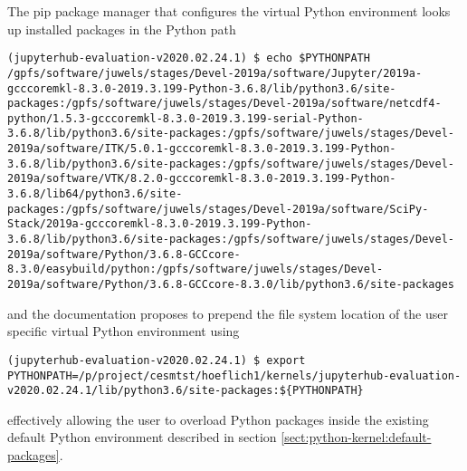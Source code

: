 \documentclass[11pt,a4paper]{article}
\begin{document}
The pip package manager that configures the virtual Python environment looks up installed packages in the Python path
%
\begin{verbatim}
(jupyterhub-evaluation-v2020.02.24.1) $ echo $PYTHONPATH
/gpfs/software/juwels/stages/Devel-2019a/software/Jupyter/2019a-gcccoremkl-8.3.0-2019.3.199-Python-3.6.8/lib/python3.6/site-packages:/gpfs/software/juwels/stages/Devel-2019a/software/netcdf4-python/1.5.3-gcccoremkl-8.3.0-2019.3.199-serial-Python-3.6.8/lib/python3.6/site-packages:/gpfs/software/juwels/stages/Devel-2019a/software/ITK/5.0.1-gcccoremkl-8.3.0-2019.3.199-Python-3.6.8/lib/python3.6/site-packages:/gpfs/software/juwels/stages/Devel-2019a/software/VTK/8.2.0-gcccoremkl-8.3.0-2019.3.199-Python-3.6.8/lib64/python3.6/site-packages:/gpfs/software/juwels/stages/Devel-2019a/software/SciPy-Stack/2019a-gcccoremkl-8.3.0-2019.3.199-Python-3.6.8/lib/python3.6/site-packages:/gpfs/software/juwels/stages/Devel-2019a/software/Python/3.6.8-GCCcore-8.3.0/easybuild/python:/gpfs/software/juwels/stages/Devel-2019a/software/Python/3.6.8-GCCcore-8.3.0/lib/python3.6/site-packages
\end{verbatim}
%
and the documentation proposes to prepend the file system location of the user specific virtual Python environment using
%
\begin{verbatim}
(jupyterhub-evaluation-v2020.02.24.1) $ export PYTHONPATH=/p/project/cesmtst/hoeflich1/kernels/jupyterhub-evaluation-v2020.02.24.1/lib/python3.6/site-packages:${PYTHONPATH}
\end{verbatim}
%
effectively allowing the user to overload Python packages inside the existing default Python environment described in section \ref{sect:python-kernel:default-packages}.
\end{document}
